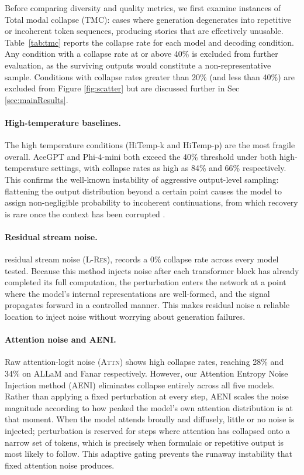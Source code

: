 \documentclass[11pt]{article}
\begin{document}
Before comparing diversity and quality metrics, we first examine instances of Total modal collapse (TMC): cases where generation degenerates into repetitive or incoherent token sequences, producing stories that are effectively unusable. Table~\ref{tab:tmc} reports the collapse rate for each model and decoding condition. Any condition with a collapse rate at or above 40\% is excluded from further evaluation, as the surviving outputs would constitute a non-representative sample. Conditions with collapse rates greater than 20\% (and less than 40\%) are excluded from Figure \ref{fig:scatter} but are discussed further in Sec \ref{sec:mainResults}.

\paragraph{High-temperature baselines.}The high temperature conditions (HiTemp-k and HiTemp-p) are the most fragile overall. AceGPT and Phi-4-mini both exceed the 40\% threshold under both high-temperature settings, with collapse rates as high as 84\% and 66\% respectively. This confirms the well-known instability of aggressive output-level sampling: flattening the output distribution beyond a certain point causes the model to assign non-negligible probability to incoherent continuations, from which recovery is rare once the context has been corrupted \cite{nguyen2025turningheatminpsampling}.

\paragraph{Residual stream noise.} residual stream noise (\textsc{L-Res}), records a 0\% collapse rate across every model tested. Because this method injects noise after each transformer block has already completed its full computation, the perturbation enters the network at a point where the model's internal representations are well-formed, and the signal propagates forward in a controlled manner. This makes residual noise a reliable location to inject noise without worrying about generation failures.

\paragraph{Attention noise and AENI.} Raw attention-logit noise (\textsc{Attn}) shows high collapse rates, reaching 28\% and 34\% on ALLaM and Fanar respectively. However, our Attention Entropy Noise Injection method (\textsc{AENI}) eliminates collapse entirely across all five models. Rather than applying a fixed perturbation at every step, AENI scales the noise magnitude according to how peaked the model's own attention distribution is at that moment. When the model attends broadly and diffusely, little or no noise is injected; perturbation is reserved for steps where attention has collapsed onto a narrow set of tokens, which is precisely when formulaic or repetitive output is most likely to follow. This adaptive gating prevents the runaway instability that fixed attention noise produces.
\vspace{-0.7em}
\end{document}
